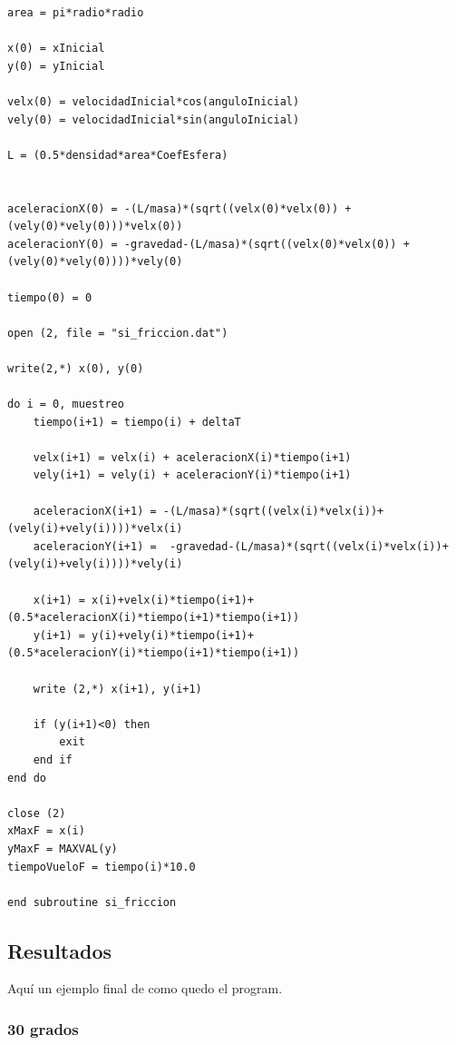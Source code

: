 \documentclass[10pt]{article}
\begin{document}
\begin{verbatim}
area = pi*radio*radio

x(0) = xInicial
y(0) = yInicial

velx(0) = velocidadInicial*cos(anguloInicial)
vely(0) = velocidadInicial*sin(anguloInicial)

L = (0.5*densidad*area*CoefEsfera)


aceleracionX(0) = -(L/masa)*(sqrt((velx(0)*velx(0)) + (vely(0)*vely(0)))*velx(0))
aceleracionY(0) = -gravedad-(L/masa)*(sqrt((velx(0)*velx(0)) + (vely(0)*vely(0))))*vely(0)

tiempo(0) = 0

open (2, file = "si_friccion.dat")

write(2,*) x(0), y(0)

do i = 0, muestreo
    tiempo(i+1) = tiempo(i) + deltaT

    velx(i+1) = velx(i) + aceleracionX(i)*tiempo(i+1)
    vely(i+1) = vely(i) + aceleracionY(i)*tiempo(i+1)

    aceleracionX(i+1) = -(L/masa)*(sqrt((velx(i)*velx(i))+(vely(i)+vely(i))))*velx(i)
    aceleracionY(i+1) =  -gravedad-(L/masa)*(sqrt((velx(i)*velx(i))+(vely(i)+vely(i))))*vely(i)

    x(i+1) = x(i)+velx(i)*tiempo(i+1)+(0.5*aceleracionX(i)*tiempo(i+1)*tiempo(i+1))
    y(i+1) = y(i)+vely(i)*tiempo(i+1)+(0.5*aceleracionY(i)*tiempo(i+1)*tiempo(i+1))

    write (2,*) x(i+1), y(i+1)

    if (y(i+1)<0) then
        exit
    end if
end do

close (2)
xMaxF = x(i)
yMaxF = MAXVAL(y)
tiempoVueloF = tiempo(i)*10.0

end subroutine si_friccion
\end{verbatim}

\newpage

\subsection{Resultados}
Aquí un ejemplo final de como quedo el program.

\subsubsection{30 grados}
\end{document}

